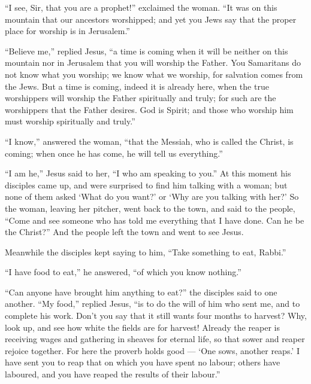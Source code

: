  ``I see, Sir, that you are a prophet!'' exclaimed the
woman.  ``It was on this mountain that our ancestors
worshipped; and yet you Jews say that the proper place for worship is in
Jerusalem.''

 ``Believe me,'' replied Jesus, ``a time is coming when it
will be neither on this mountain nor in Jerusalem that you will worship
the Father.  You Samaritans do not know what you worship;
we know what we worship, for salvation comes from the Jews.
 But a time is coming, indeed it is already here, when the
true worshippers will worship the Father spiritually and truly; for such
are the worshippers that the Father desires.  God is
Spirit; and those who worship him must worship spiritually and truly.''

 ``I know,'' answered the woman, ``that the Messiah, who is
called the Christ, is coming; when once he has come, he will tell us
everything.''

 ``I am he,'' Jesus said to her, ``I who am speaking to
you.''  At this moment his disciples came up, and were
surprised to find him talking with a woman; but none of them asked `What
do you want?' or `Why are you talking with her?'  So the
woman, leaving her pitcher, went back to the town, and said to the
people,  ``Come and see someone who has told me everything
that I have done. Can he be the Christ?''  And the people
left the town and went to see Jesus.

 Meanwhile the disciples kept saying to him, ``Take
something to eat, Rabbi.''

 ``I have food to eat,'' he answered, ``of which you know
nothing.''

 ``Can anyone have brought him anything to eat?'' the
disciples said to one another.  ``My food,'' replied Jesus,
``is to do the will of him who sent me, and to complete his work.
 Don't you say that it still wants four months to harvest?
Why, look up, and see how white the fields are for harvest!
 Already the reaper is receiving wages and gathering in
sheaves for eternal life, so that sower and reaper rejoice together.
 For here the proverb holds good --- `One sows, another
reaps.'  I have sent you to reap that on which you have
spent no labour; others have laboured, and you have reaped the results
of their labour.''

